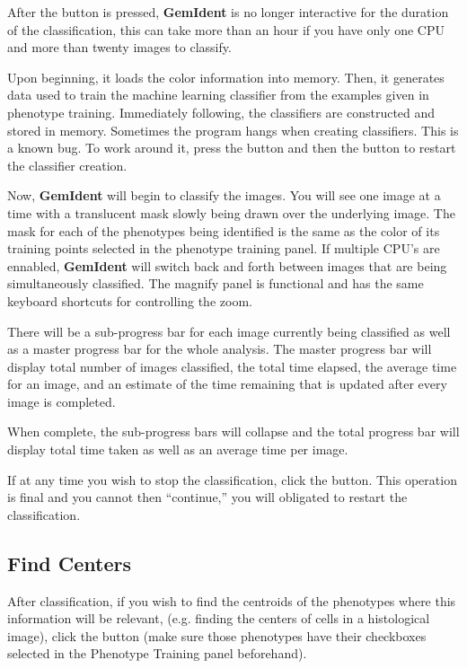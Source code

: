 \documentclass[12pt]{article}
\begin{document}
After the  button is pressed, {\bf GemIdent} is no longer interactive for the duration of the classification, this can take more than an hour if you have only one CPU and more than twenty images to classify.

Upon beginning, it loads the color information into memory. Then, it generates data used to train the machine learning classifier from the examples given in phenotype training. Immediately following, the classifiers are constructed and stored in memory. Sometimes the program hangs when creating classifiers. This is a known bug. To work around it, press the  button and then the  button to restart the classifier creation.

Now, {\bf GemIdent} will begin to classify the images. You will see one image at a time with a translucent mask slowly being drawn over the underlying image. The mask for each of the phenotypes being identified is the same as the color of its training points selected in the {\sf phenotype training} panel. If multiple CPU's are ennabled, {\bf GemIdent} will switch back and forth between images that are being simultaneously classified. The magnify panel is functional and has the same keyboard shortcuts for controlling the zoom.

There will be a sub-progress bar for each image currently being classified as well as a master progress bar for the whole analysis. The master progress bar will display total number of images classified, the total time elapsed, the average time for an image, and an estimate of the time remaining that is updated after every image is completed.

When complete, the sub-progress bars will collapse and the total progress bar will display total time taken as well as an average time per image.

If at any time you wish to stop the classification, click the  button. This operation is final and you cannot then ``continue,'' you will obligated to restart the classification.

\subsection{Find Centers}

After classification, if you wish to find the centroids of the phenotypes where this information will be relevant, 
(e.g. finding the centers of cells in a histological image),
click the  button (make sure those phenotypes have their  checkboxes selected in the {\sf Phenotype Training} panel beforehand).
\end{document}
